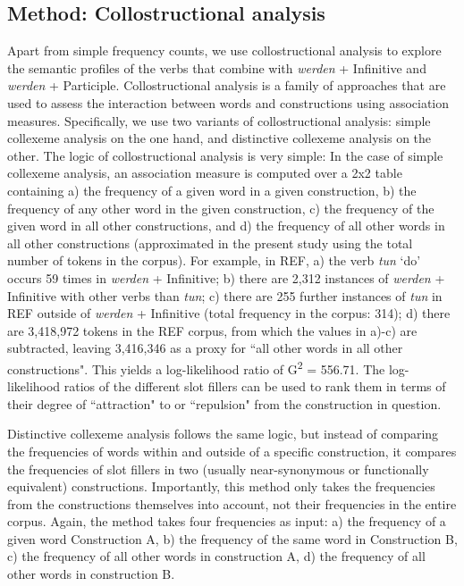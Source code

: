 \documentclass[output=paper,colorlinks,citecolor=brown]{langscibook}
\begin{document}
\subsection{Method: Collostructional analysis} \label{sec:hs:collanal}

Apart from simple frequency counts, we use collostructional analysis \citep[][]{stefanowitschCollostructionalAnalysis2013} to explore the semantic profiles of the verbs that combine with \textit{werden} + Infinitive and \textit{werden} + Participle. Collostructional analysis is a family of approaches that are used to assess the interaction between words and constructions using association measures. Specifically, we use two variants of collostructional analysis:  simple collexeme analysis \citep[][]{stefanowitschCollostructionsInvestigatingInteraction2003} on the one hand, and distinctive collexeme analysis \citep[][]{stefanowitschDistinctiveCollexemeAnalysis2006} on the other. The logic of collostructional analysis is very simple: In the case of simple collexeme analysis, an association measure is computed over a 2x2 table containing a) the frequency of a given word in a given construction, b) the frequency of any other word in the given construction, c) the frequency of the given word in all other constructions, and d) the frequency of all other words in all other constructions (approximated in the present study using the total number of tokens in the corpus). For example, in REF, a) the verb \textit{tun} `do' occurs 59 times in \textit{werden} + Infinitive; b) there are 2,312 instances of \textit{werden} + Infinitive with other verbs than \textit{tun}; c) there are 255 further instances of \textit{tun} in REF outside of \textit{werden} + Infinitive (total frequency in the corpus: 314); d) there are 3,418,972 tokens in the REF corpus, from which the values in a)-c) are subtracted, leaving 3,416,346 as a proxy for ``all other words in all other constructions". This yields a log-likelihood ratio of G\textsuperscript{2} = 556.71. The log-likelihood ratios of the different slot fillers can be used to rank them in terms of their degree of ``attraction" to or ``repulsion" from the construction in question.

Distinctive collexeme analysis follows the same logic, but instead of comparing the frequencies of words within and outside of a specific construction, it compares the frequencies of slot fillers in two (usually near-synonymous or functionally equivalent) constructions. Importantly, this method only takes the frequencies from the constructions themselves into account, not their frequencies in the entire corpus. Again, the method takes four frequencies as input: a) the frequency of a given word Construction A, b) the frequency of the same word in Construction B, c) the frequency of all other words in construction A, d) the frequency of all other words in construction B. 
\end{document}
